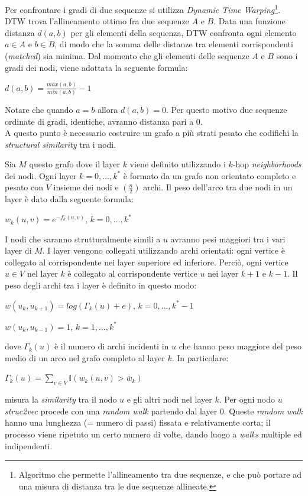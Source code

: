 \documentclass[11pt]{article}
\begin{document}
Per confrontare i gradi di due sequenze si utilizza \textit{Dynamic Time Warping}\footnote{Algoritmo che permette l'allineamento tra due sequenze, e che può portare ad una misura di distanza tra le due sequenze allineate.}. DTW trova l'allineamento ottimo fra due sequenze $A$ e $B$. Data una funzione distanza $d(a,b)$ per gli elementi della sequenza, DTW confronta ogni elemento $a \in A$ e $b \in B$, di modo che la somma delle distanze tra elementi corrispondenti (\textit{matched}) sia minima. Dal momento che gli elementi delle sequenze $A$ e $B$ sono i gradi dei nodi, viene adottata la seguente formula:
\begin{center}
$d(a,b) = \displaystyle{\frac{max(a,b)}{min(a,b)}}-1$
\end{center}

Notare che quando $a = b$ allora $d(a,b) = 0$. Per questo motivo due sequenze ordinate di gradi, identiche, avranno distanza pari a 0.\\

A questo punto è necessario costruire un grafo a più strati pesato che codifichi la \textit{structural similarity} tra i nodi. 

Sia $M$ questo grafo dove il layer $k$ viene definito utilizzando i $k$-hop \textit{neighborhoods} dei nodi. Ogni layer $k = 0,...,k^*$ è formato da un grafo non orientato completo e pesato con $V$ insieme dei nodi e $\displaystyle{\left(\frac{n}{2}\right)}$ archi. Il peso dell'arco tra due nodi in un layer è dato dalla seguente formula:
\begin{center}
$w_k(u,v) = e^{-f_k(u,v)}$, $k = 0,...,k^*$
\end{center}
I nodi che saranno strutturalmente simili a $u$ avranno pesi maggiori tra i vari layer di $M$. I layer vengono collegati utilizzando archi orientati: ogni vertice è collegato al corrispondente nei layer superiore ed inferiore. Perciò, ogni vertice $u \in V$ nel layer $k$ è collegato al corrispondente vertice $u$ nei layer $k+1$ e $k-1$. Il peso degli archi tra i layer è definito in questo modo:
\begin{center}
$w(u_k,u_{k+1}) = log(\Gamma_k(u) + e)$, $k = 0,...,k^*-1$
\end{center}
\begin{center}
$w(u_k,u_{k-1}) = 1$, $k = 1,...,k^*$
\end{center}
dove $\Gamma_k(u)$ è il numero di archi incidenti in $u$ che hanno peso maggiore del peso medio di un arco nel grafo completo al layer $k$. In particolare:
\begin{center}
$\Gamma_k(u) = \displaystyle{\sum_{v \in V}} \mathbb{I}(w_k(u,v) > \bar w_k)$
\end{center}
misura la \textit{similarity} tra il nodo $u$ e gli altri nodi nel layer $k$.
Per ogni nodo $u$ \textit{struc2vec} procede con una \textit{random walk} partendo dal layer 0. Queste \textit{random walk} hanno una lunghezza (= numero di passi) fissata e relativamente corta; il processo viene ripetuto un certo numero di volte, dando luogo a \textit{walks} multiple ed indipendenti.
\end{document}
